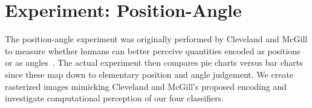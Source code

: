 \clearpage
\section{Experiment: Position-Angle}

The position-angle experiment was originally performed by Cleveland and McGill to measure whether humans can better perceive quantities encoded as positions or as angles~\cite{cleveland_mcgill}. The actual experiment then compares pie charts versus bar charts since these map down to elementary position and angle judgement. We create rasterized images mimicking Cleveland and McGill's proposed encoding and investigate computational perception of our four classifiers.

\begin{table}[h]
\centering
\caption{\textbf{Position-Angle Experiment.} We create rasterized visualizations of pie charts and bar charts to follow Cleveland and McGill's position-angle experiment. The experimental task involves the judgement of different encoded values in comparison to the largest encoded values. The pie chart and the bar chart visualize the same data point. In their paper, Cleveland and McGill report less errors using bar charts.}
\label{tab:pos_angle_parameters}
\end{table}

